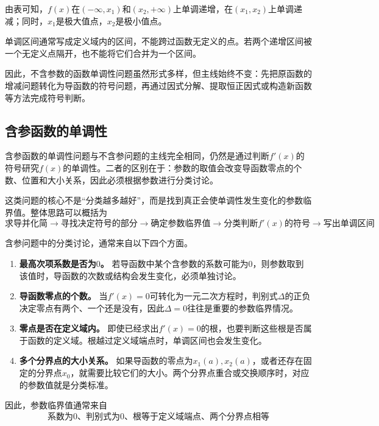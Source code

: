 由表可知，$f(x)$在$(-\infty,x_1)$和$(x_2,+\infty)$上单调递增，在$(x_1,x_2)$上单调递减；同时，$x_1$是极大值点，$x_2$是极小值点。

\begin{remark}
单调区间通常写成定义域内的区间，不能跨过函数无定义的点。若两个递增区间被一个无定义点隔开，也不能将它们合并为一个区间。
\end{remark}


因此，不含参数的函数单调性问题虽然形式多样，但主线始终不变：先把原函数的增减问题转化为导函数的符号问题，再通过因式分解、提取恒正因式或构造新函数等方法完成符号判断。


\subsection{含参函数的单调性}

含参函数的单调性问题与不含参问题的主线完全相同，仍然是通过判断$f'(x)$的符号研究$f(x)$的单调性。二者的区别在于：参数的取值会改变导函数零点的个数、位置和大小关系，因此必须根据参数进行分类讨论。

这类问题的核心不是“分类越多越好”，而是找到真正会使单调性发生变化的参数临界值。整体思路可以概括为
\[
\boxed{
\text{求导并化简}
\longrightarrow
\text{寻找决定符号的部分}
\longrightarrow
\text{确定参数临界值}
\longrightarrow
\text{分类判断$f'(x)$的符号}
\longrightarrow
\text{写出单调区间}
}
\]

\medskip
{}

含参问题中的分类讨论，通常来自以下四个方面。

\begin{enumerate}
  \item \textbf{最高次项系数是否为$0$。} 若导函数中某个含参数的系数可能为$0$，则参数取到该值时，导函数的次数或结构会发生变化，必须单独讨论。
  \item \textbf{导函数零点的个数。} 当$f'(x)=0$可转化为一元二次方程时，判别式$\Delta$的正负决定零点有两个、一个还是没有，因此$\Delta=0$往往是重要的参数临界情况。
  \item \textbf{零点是否在定义域内。} 即使已经求出$f'(x)=0$的根，也要判断这些根是否属于函数的定义域。根越过定义域端点时，单调区间也会发生变化。
  \item \textbf{多个分界点的大小关系。} 如果导函数的零点为$x_1(a),x_2(a)$，或者还存在固定的分界点$x_0$，就需要比较它们的大小。两个分界点重合或交换顺序时，对应的参数值就是分类标准。
\end{enumerate}

因此，参数临界值通常来自
\[
\boxed{
\text{系数为$0$、判别式为$0$、根等于定义域端点、两个分界点相等}
}
\]

